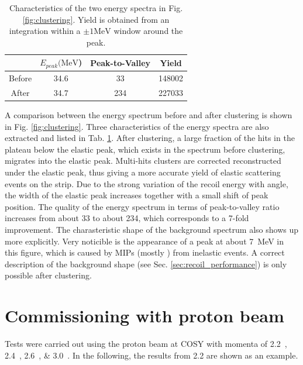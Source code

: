 \documentclass[number,5p]{elsarticle}
\begin{document}
\begin{table}[h!]
  \centering
  \caption{Characteristics of the two energy spectra in Fig.
    \ref{fig:clustering}. Yield is obtained from an integration within a $\pm 1\si{\MeV}$ window
    around the peak.}
  \label{tab:clustering}
  \begin{tabular}{cccc}
    \hline
    & $E_{peak}(\si{\MeV}$) & Peak-to-Valley & Yield \\
    \hline
    Before & 34.6 & 33  & 148002 \\
    After  & 34.7 & 234 & 227033 \\
    \hline
  \end{tabular}
\end{table}
A comparison between the energy spectrum before and after clustering is shown in Fig. \ref{fig:clustering}.
Three characteristics of the energy spectra are also extracted and listed in Tab. \ref{tab:clustering}.
After clustering, a large fraction of the hits in the plateau below the elastic
peak, which exists in the spectrum before clustering, migrates into the elastic peak.
Multi-hits clusters are corrected reconstructed under the elastic peak, thus
giving a more accurate yield of elastic scattering events on the strip.
Due to the strong variation of the recoil energy with angle, the width of the
elastic peak increases together with a small shift of peak position.
The quality of the energy spectrum in terms of peak-to-valley ratio increases from about 33 to about 234, which corresponds to a 7-fold improvement.
The charasteristic shape of the background spectrum also shows up more explicitly.
Very noticible is the appearance of a peak at about \SI{7}{\MeV} in this figure,
which is caused by MIPs (mostly \Pgppm) from inelastic events.
A correct description of the background shape (see Sec.
\ref{sec:recoil_performance}) is only possible after clustering.

\section{Commissioning with proton beam}
\label{sec:result}

Tests were carried out using the proton beam at COSY with momenta of
\SIlist[list-units=single]{2.2;2.4;2.6;3.0}{\momentum}.
In the following, the results from \SI{2.2}{\momentum} are shown as an example.
\end{document}
